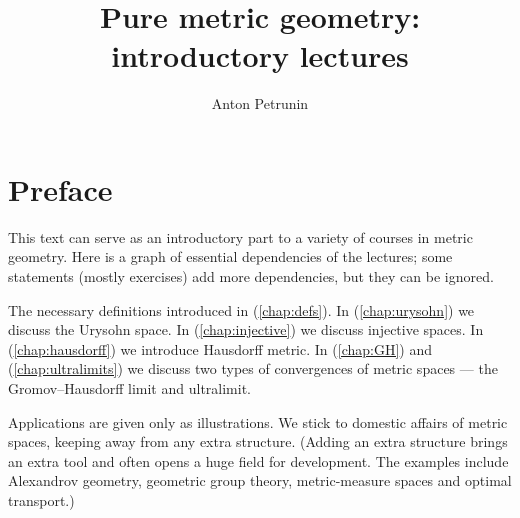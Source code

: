 \documentclass[twoside]{book}
\begin{document}

 
\title{Pure metric geometry:\\
introductory lectures}
\author{Anton Petrunin}
\date{}
\maketitle

\section*{Preface}

This text can serve as an introductory part to a variety of courses in metric geometry.
Here is a graph of essential dependencies of the lectures; some statements (mostly exercises) add more dependencies, but they can be ignored.
\begin{figure}[!ht]
\centering
{}
\end{figure}
The necessary definitions introduced in (\ref{chap:defs}).
In (\ref{chap:urysohn}) we discuss the Urysohn space.
In (\ref{chap:injective}) we discuss injective spaces.
In (\ref{chap:hausdorff}) we introduce Hausdorff metric.
In (\ref{chap:GH}) and (\ref{chap:ultralimits}) we discuss two types of convergences of metric spaces --- the Gromov--Hausdorff limit and ultralimit.

Applications are given only as illustrations.
We stick to domestic affairs of metric spaces, keeping away from any extra structure. 
(Adding an extra structure brings an extra tool and often opens a huge field for development.
The examples include Alexandrov geometry,
geometric group theory,
metric-measure spaces and optimal transport.)
\end{document}
